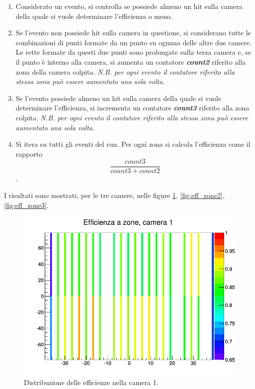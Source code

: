 \documentclass[8pt]{extarticle}
\begin{document}
\begin{enumerate}
\item Considerato un evento, si controlla se possiede almeno un hit sulla camera della quale si vuole determinare l'efficienza o meno.
\item Se l'evento non possiede hit sulla camera in questione, si considerano tutte le combinazioni di punti formate da un punto su ognuna delle altre due camere. Le rette formate da questi due punti sono prolungate sulla terza camera e, se il punto è interno alla camera, si aumenta un contatore \textbf{\textit{count2}} riferito alla zona della camera colpita. \textit{N.B. per ogni evento il contatore riferito alla stessa zona può essere aumentato una sola volta}.
\item Se l'evento possiede almeno un hit sulla camera della quale si vuole determinare l'efficienza, si incrementa un contatore \textbf{\textit{count3}} riferito alla zona colpita. \textit{N.B. per ogni evento il contatore riferito alla stessa zona può essere aumentato una sola volta}.
\item Si itera su tutti gli eventi del run. Per ogni zona si calcola l'efficienza come il rapporto \[\frac{count3}{count3 + count2}\].
\end{enumerate}

I risultati sono mostrati, per le tre camere, nelle figure \ref{fig:eff_zone1}, \ref{fig:eff_zone2}, \ref{fig:eff_zone3}. 

\begin{figure}
\begin{center}
\includegraphics[scale=0.3]{eff_zone1}
\caption{Distribuzione delle efficienze nella camera 1.}
\label{fig:eff_zone1}
\end{center}
\end{figure}
\end{document}
